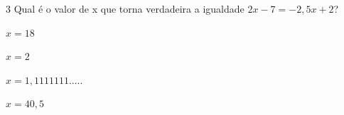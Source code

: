 








\num{3} Qual é o valor de x que torna verdadeira a igualdade $2x - 7 = -2,5x + 2$?

\begin{escolha}
\item $x = 18$
\item $x = 2$
\item $x = 1,1111111.\ldots.$
\item $x = 40,5$
\end{escolha}











